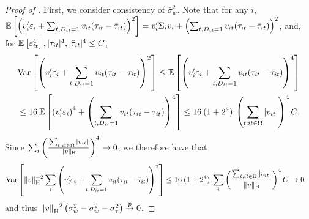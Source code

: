 \documentclass[english,11pt]{article}
\theoremstyle{plain}
\theoremstyle{plain}
\theoremstyle{plain}
\theoremstyle{plain}
\let\ref\Cref
\begin{document}
\begin{proof}[Proof of \ref{thm:se}]
First, we consider consistency of $\bar{\sigma}_{w}^{2}$. Note that
for any $i$, $\mathbb{E}\left[\left(v_{i}'\varepsilon_{i}+\sum_{t,D_{it}=1}v_{it}(\tau_{it}-\bar{\tau}_{it})\right)^{2}\right]=v_{i}'\Sigma_{i}v_{i}+\left(\sum_{t,D_{it}=1}v_{it}(\tau_{it}-\bar{\tau}_{it})\right)^{2}$,
and, for $\mathbb{E}\left[\varepsilon_{it}^{4}\right],|\tau_{it}|^{4},|\bar{\tau}_{it}|^{4}\leq C$,
\begin{align*}
 & \mathrm{Var}\left[\left(v_{i}'\varepsilon_{i}+\sum_{t,D_{it}=1}v_{it}(\tau_{it}-\bar{\tau}_{it})\right)^{2}\right]\leq\mathbb{E}\left[\left(v_{i}'\varepsilon_{i}+\sum_{t,D_{it}=1}v_{it}(\tau_{it}-\bar{\tau}_{it})\right)^{4}\right]\\
 & \leq16\:\mathbb{E}\left[\left(v_{i}'\varepsilon_{i}\right)^{4}+\left(\sum_{t,D_{it}=1}v_{it}(\tau_{it}-\bar{\tau}_{it})\right)^{4}\right]\leq16\:(1+2^{4})\:\left(\sum_{t;it\in\Omega}|v_{it}|\right)^{4}C.
\end{align*}
Since $\sum_{i}\left(\frac{\sum_{t;it\in\Omega}|v_{it}|}{\|v\|_{\textnormal{H}}}\right)^{4}\rightarrow0$,
we therefore have that
\begin{align*}
\mathrm{Var}\left[\|v\|_{\textnormal{H}}^{-2}\sum_{i}\left(v_{i}'\varepsilon_{i}+\sum_{t,D_{it}=1}v_{it}(\tau_{it}-\bar{\tau}_{it})\right)^{2}\right] & \leq16\:(1+2^{4})\:\sum_{i}\left(\frac{\sum_{t;it\in\Omega}|v_{it}|}{\|v\|_{\textnormal{H}}}\right)^{4}C\rightarrow0
\end{align*}
and thus $\|v\|_{\textnormal{H}}^{-2}\left(\bar{\sigma}_{w}^{2}-\sigma_{w}^{2}-\sigma_{\tau}^{2}\right)\stackrel{p}{\rightarrow}0$.


\end{proof}
\end{document}

